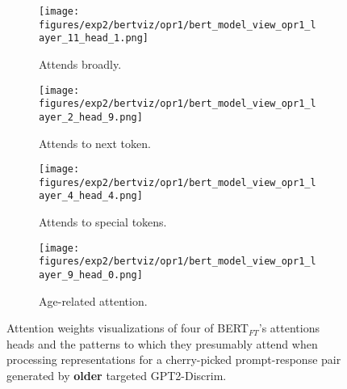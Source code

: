 \begin{figure}[H]
     \centering
     \begin{subfigure}[b]{0.22\textwidth}
        \centering
        \texttt{[image: figures/exp2/bertviz/opr1/bert\_model\_view\_opr1\_layer\_11\_head\_1.png]}
        \captionsetup{font=footnotesize,labelfont=footnotesize}
        \caption{Attends broadly.}
        \label{subfig:bertviz_model_view_opr1_broad}
     \end{subfigure}
     \quad
     \begin{subfigure}[b]{0.22\textwidth}
        \centering
        \texttt{[image: figures/exp2/bertviz/opr1/bert\_model\_view\_opr1\_layer\_2\_head\_9.png]}
        \captionsetup{font=footnotesize,labelfont=footnotesize}
        \caption{Attends to next token.}
        \label{subfig:bertviz_model_view_opr1_next}
     \end{subfigure}
    \quad
    \begin{subfigure}[b]{0.22\textwidth}
        \centering
        \texttt{[image: figures/exp2/bertviz/opr1/bert\_model\_view\_opr1\_layer\_4\_head\_4.png]}
        \captionsetup{font=footnotesize,labelfont=footnotesize}
        \caption{Attends to special tokens.}
        \label{subfig:bertviz_model_view_opr1_special}
     \end{subfigure}
    \quad
     \begin{subfigure}[b]{0.22\textwidth}
        \centering
        \texttt{[image: figures/exp2/bertviz/opr1/bert\_model\_view\_opr1\_layer\_9\_head\_0.png]}
        \captionsetup{font=footnotesize,labelfont=footnotesize}
        \caption{Age-related attention.}
        \label{subfig:bertviz_model_view_opr1_age}
     \end{subfigure}
    \caption{Attention weights visualizations of four of BERT$_{FT}$'s attentions heads and the patterns to which they presumably attend when processing representations for a cherry-picked prompt-response pair generated by \textbf{older} targeted GPT2-Discrim.}
    \label{fig:bertviz_model_view_opr1}
\end{figure}


